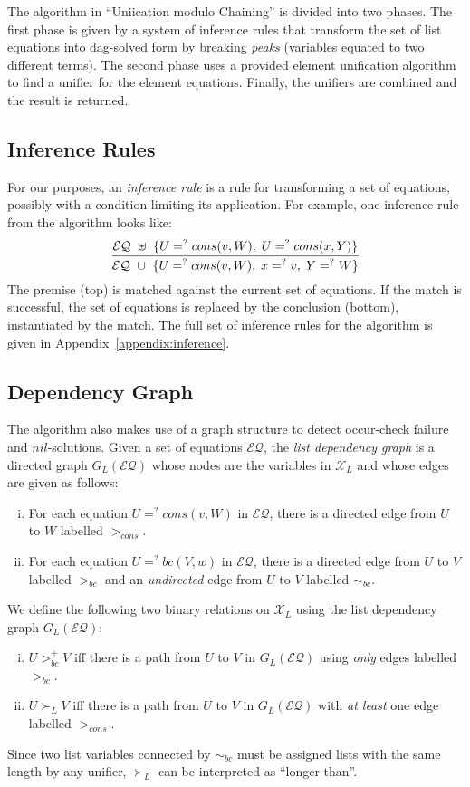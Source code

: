 \documentclass[11pt]{article}
\newcommand{\ueq}{=_{}^?}
\newcommand{\X}{\mathcal{X}}
\newcommand{\EQ}{\mathcal{EQ}}
\newcommand{\Bc}{\mathit{bc}}
\newcommand{\Cons}{\mathit{cons}}
\newcommand{\Nil}{\mathit{nil}}
\begin{document}
The algorithm in ``Uniication modulo Chaining'' is divided into two phases.
The first phase is given by a system of inference rules that transform the
set of list equations into dag-solved form by breaking \emph{peaks} (variables
equated to two different terms). The second phase uses a provided
element unification algorithm to find a unifier for the element equations.
Finally, the unifiers are combined and the result is returned.

\subsection{Inference Rules}\label{subsection:inference}

For our purposes, an \emph{inference rule} is a rule for transforming a set of
equations, possibly with a condition limiting its application. For example, one
inference rule from the algorithm looks like:
\[\infer
    {\EQ ~ \cup ~ \{ U \ueq cons(v, W), \; x \ueq v, \; Y \ueq W \}}
    {\EQ ~ \uplus ~ \{ U \ueq cons(v, W), \; U \ueq cons(x, Y) \}}
\]
The premise (top) is matched against the current set of equations. If
the match is successful, the set of equations is replaced by the conclusion
(bottom), instantiated by the match. The full set of inference rules for the
algorithm is given in Appendix~\ref{appendix:inference}.

\subsection{Dependency Graph}\label{subsection:graph}

The algorithm also makes use of a graph structure to detect occur-check failure
and $\Nil$-solutions. Given a set of equations $\EQ$, the \emph{list dependency
graph} is a directed graph $G_L(\EQ)$ whose nodes are the variables in $\X_L$ and
whose edges are given as follows:
\begin{enumerate}[(i)]
    \item For each equation $U \ueq \Cons(v, W)$ in $\EQ$, there is a directed
        edge from $U$ to $W$ labelled $>_{\Cons}$.
    \item For each equation $U \ueq \Bc(V, w)$ in $\EQ$, there is a directed
        edge from $U$ to $V$ labelled $>_{\Bc}$ and an \emph{undirected} edge
        from $U$ to $V$ labelled $\sim_{\Bc}$.
\end{enumerate}
We define the following two binary relations on $\X_L$ using the list dependency
graph $G_L(\EQ)$:
\begin{enumerate}[(i)]
    \item $U >_{\Bc}^+ V$ iff there is a path from $U$ to $V$ in $G_L(\EQ)$
        using \emph{only} edges labelled $>_{\Bc}$.

    \item $U \succ_L V$ iff there is a path from $U$ to $V$ in $G_L(\EQ)$ with
        \emph{at least} one edge labelled $>_{\Cons}$.
\end{enumerate}
Since two list variables connected by $\sim_{\Bc}$ must be assigned lists with
the same length by any unifier, $\succ_L$ can be interpreted as ``longer than''.
\end{document}

